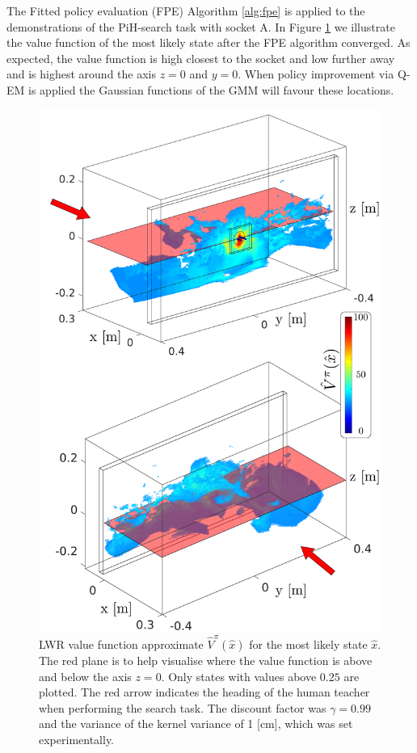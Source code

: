 The Fitted policy evaluation (FPE) Algorithm \ref{alg:fpe} is applied to the demonstrations of the PiH-search task with socket A. 
In Figure \ref{fig:Figure1}  we illustrate the value function of the most likely state after the FPE algorithm converged. 
As expected, the value function is high closest to the socket and low further away and is highest around the axis $z=0$ 
and $y=0$. When policy improvement via Q-EM is applied the Gaussian functions of the GMM will favour these locations. 

\begin{figure}
 \centering
 \includegraphics[width=\textwidth]{./ch4-PiH/Figures/ValueFunction/value_func_final_v2.pdf}
 \caption{LWR value function approximate $\hat{V}^{\pi}(\hat{x})$ for the most likely state $\hat{x}$. 
 The red plane is to help visualise where the value function is above and below the axis $z=0$. Only states with values above
 $0.25$ are plotted.  The red arrow indicates the heading of the human teacher when performing the search task. The discount 
 factor was $\gamma=0.99$ and the variance of the kernel variance of 1 [cm], which was set experimentally.
}
 \label{fig:Figure1}
\end{figure}

